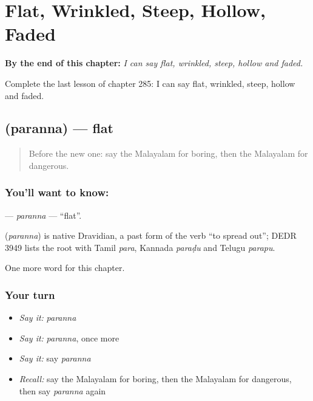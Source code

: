 
\chapter{Flat, Wrinkled, Steep, Hollow, Faded}
\label{ch:ml-flat-wrinkled-steep-hollow-faded}

\begin{chapteropening}
\textbf{By the end of this chapter:} \emph{I can say flat, wrinkled, steep, hollow and faded.}

Complete the last lesson of chapter 285: I can say flat, wrinkled, steep, hollow and faded.
\end{chapteropening}

\section[\texorpdfstring{\ml{പരന്ന} (paranna)}{പരന്ന (paranna)}]{ (paranna) — flat}

\label{lesson:ML-C285-paranna}



\begin{quote}
Before the new one: say the Malayalam for boring, then the Malayalam for dangerous.
\end{quote}

\subsection*{You'll want to know: }
\textbf{} — \emph{paranna} — \textquotedblleft{}flat\textquotedblright{}.

\begin{cousinweb}
\textbf{} (\emph{paranna}) is native Dravidian, a past form of the verb \textquotedblleft{}to spread out\textquotedblright{}; DEDR 3949 lists the root with Tamil \emph{para}, Kannada \emph{paraḍu} and Telugu \emph{parapu}.
\end{cousinweb}

\begin{grammarlens}[title={What you've built}]
One more word for this chapter.
\end{grammarlens}

\subsection*{Your turn}
\begin{itemize}
\raggedright
  \item \emph{Say it:} \emph{paranna}
  \item \emph{Say it:} \emph{paranna}, once more
  \item \emph{Say it:} say \emph{paranna}
  \item \emph{Recall:} say the Malayalam for boring, then the Malayalam for dangerous, then say \emph{paranna} again
\end{itemize}

